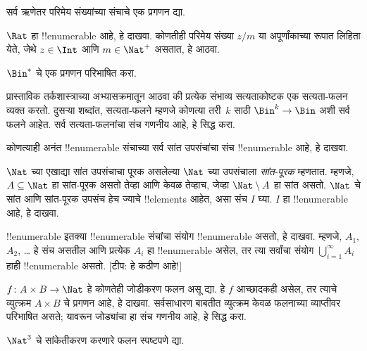 \documentclass[../../../include/open-logic-section]{subfiles}
\begin{document}
\begin{prob}
सर्व ऋणेतर परिमेय संख्यांच्या संचाचे एक प्रगणन द्या.
\end{prob}

\begin{prob}
$\Rat$ हा !!{enumerable} आहे, हे दाखवा. कोणतीही परिमेय संख्या
$z/m$ या अपूर्णांकाच्या रूपात लिहिता येते, जेथे $z \in \Int$ आणि
$m \in \Nat^+$ असतात, हे आठवा.
\end{prob}

\begin{prob}
$\Bin^*$ चे एक प्रगणन परिभाषित करा.
\end{prob}

\begin{prob}
प्रास्ताविक तर्कशास्त्राच्या अभ्यासक्रमातून आठवा की प्रत्येक संभाव्य
सत्यताकोष्टक एक सत्यता-फलन व्यक्त करतो. दुसऱ्या शब्दांत, सत्यता-फलने
म्हणजे कोणत्या तरी~$k$ साठी $\Bin^k \to \Bin$ अशी सर्व फलने आहेत.
सर्व सत्यता-फलनांचा संच गणनीय आहे, हे सिद्ध करा.
\end{prob}

\begin{prob}
कोणत्याही अनंत !!{enumerable} संचाच्या सर्व सांत उपसंचांचा संच
!!{enumerable} आहे, हे दाखवा.
\end{prob}

\begin{prob}
$\Nat$ च्या एखाद्या सांत उपसंचाचा पूरक असलेल्या $\Nat$ च्या उपसंचाला
\emph{सांत-पूरक} म्हणतात. म्हणजे, $A \subseteq \Nat$ हा सांत-पूरक
असतो तेव्हा आणि केवळ तेव्हाच, जेव्हा $\Nat\setminus A$ हा सांत असतो.
%
$\Nat$ चे सांत आणि सांत-पूरक उपसंच हेच ज्याचे !!{element}s आहेत,
असा संच $I$ घ्या. $I$ हा !!{enumerable} आहे, हे दाखवा.
\end{prob}

\begin{prob}
!!{enumerable} इतक्या !!{enumerable} संचांचा संयोग !!{enumerable} असतो,
हे दाखवा. म्हणजे, $A_1$, $A_2$, \dots{} हे संच असतील आणि प्रत्येक
$A_i$ हा !!{enumerable} असेल, तर त्या सर्वांचा संयोग
$\bigcup_{i=1}^\infty A_i$ हाही !!{enumerable} असतो. [टीप: हे कठीण आहे!]
\end{prob}

\begin{prob}
$f \colon A \times B \to \Nat$ हे कोणतेही जोडीकरण फलन असू द्या.
हे $f$ आच्छादकही असेल, तर त्याचे व्युत्क्रम $A \times B$ चे प्रगणन
आहे, हे दाखवा. सर्वसाधारण बाबतीत व्युत्क्रम केवळ फलनाच्या व्याप्तीवर
परिभाषित असते; यावरून जोड्यांचा हा संच गणनीय आहे, हे सिद्ध करा.
\end{prob}

\begin{prob}
$\Nat^3$ चे सांकेतीकरण करणारे फलन स्पष्टपणे द्या.
\end{prob}
\end{document}
